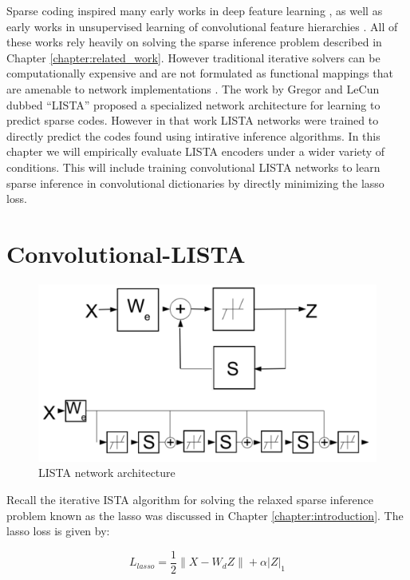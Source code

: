 Sparse coding inspired many early works in deep feature learning
\cite{SC,SAE,SAE2}, as well as early works in unsupervised learning of
convolutional feature hierarchies \cite{ConvSC}. All of these works rely
heavily on solving the sparse inference problem described in Chapter
\ref{chapter:related_work}. However traditional iterative solvers can be
computationally expensive and are not formulated as functional mappings that
are amenable to network implementations \cite{FISTA}. The work by Gregor and
LeCun dubbed ``LISTA'' \cite{LISTA} proposed a specialized network architecture
for learning to predict sparse codes. However in that work LISTA networks were
trained to directly predict the codes found using intirative inference
algorithms. In this chapter we will empirically evaluate LISTA encoders under
a wider variety of conditions. This will include training convolutional LISTA
networks to learn sparse inference in convolutional dictionaries by directly
minimizing the lasso loss.

\section{Convolutional-LISTA} 

\begin{figure}
\centering
\includegraphics[scale=0.3]{./figures/LISTA/LISTA.pdf}
\caption{LISTA network architecture} 
\label{fig:LISTA} 
\end{figure}  

Recall the iterative ISTA algorithm for solving the relaxed sparse inference problem
known as the lasso was discussed in Chapter \ref{chapter:introduction}. 
The lasso loss is given by:
  
\begin{equation}
L_{lasso} = \frac{1}{2}\|X-W_dZ\| + \alpha |Z|_1 
\label{eqn:lasso} 
\end{equation} 

